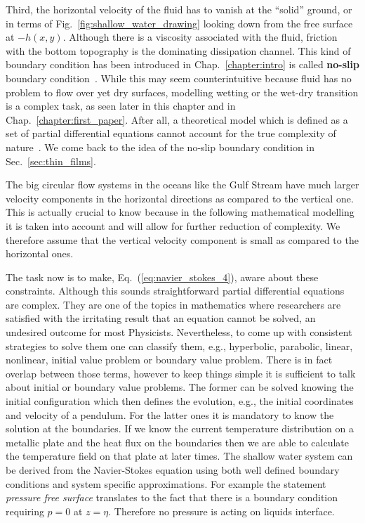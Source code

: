 Third, the horizontal velocity of the fluid has to vanish at the ``solid'' ground, or in terms of Fig.~\ref{fig:shallow_water_drawing} looking down from the free surface at $-h(x,y)$.
Although there is a viscosity associated with the fluid, friction with the bottom topography is the dominating dissipation channel.
This kind of boundary condition has been introduced in Chap.~\ref{chapter:intro} is called \textbf{no-slip} boundary condition~\cite{richardsonNoslipBoundaryCondition1973, degennesFluidWallSlippage2002, salmonLatticeBoltzmannMethod1999}.
While this may seem counterintuitive because fluid has no problem to flow over yet dry surfaces, modelling wetting or the wet-dry transition is a complex task, as seen later in this chapter and in Chap.~\ref{chapter:first_paper}.
After all, a theoretical model which is defined as a set of partial differential equations cannot account for the true complexity of nature~\cite{scrivenPhysicsApplicationsDIP1988}.
We come back to the idea of the no-slip boundary condition in Sec.~\ref{sec:thin_films}.

The big circular flow systems in the oceans like the Gulf Stream have much larger velocity components in the horizontal directions as compared to the vertical one.  
This is actually crucial to know because in the following mathematical modelling it is taken into account and will allow for further reduction of complexity.
We therefore assume that the vertical velocity component is small as compared to the horizontal ones.

The task now is to make, Eq.~(\ref{eq:navier_stokes_4}), aware about these constraints.
Although this sounds straightforward partial differential equations are complex. 
They are one of the topics in mathematics where researchers are satisfied with the irritating result that an equation cannot be solved, an undesired outcome for most Physicists.
Nevertheless, to come up with consistent strategies to solve them one can classify them, e.g., hyperbolic, parabolic, linear, nonlinear, initial value problem or boundary value problem.
There is in fact overlap between those terms, however to keep things simple it is sufficient to talk about initial or boundary value problems.
The former can be solved knowing the initial configuration which then defines the evolution, e.g., the initial coordinates and velocity of a pendulum. 
For the latter ones it is mandatory to know the solution at the boundaries. 
If we know the current temperature distribution on a metallic plate and the heat flux on the boundaries then we are able to calculate the temperature field on that plate at later times.
The shallow water system can be derived from the Navier-Stokes equation using both well defined boundary conditions and system specific approximations.
For example the statement \textit{pressure free surface} translates to the fact that there is a boundary condition requiring $p = 0$ at $z = \eta$. 
Therefore no pressure is acting on liquids interface.

